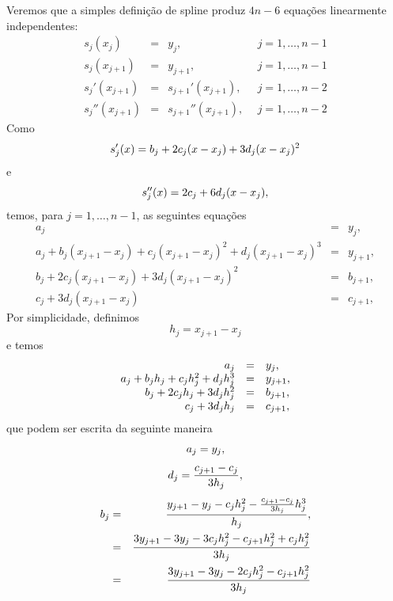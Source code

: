 Veremos que a simples definição de spline produz $4n-6$ equações linearmente independentes:
\begin{equation*}
\begin{array}{rcll}
s_j(x_j)&=&y_j,~~ &j=1,\ldots, n-1\\
s_{j}(x_{j+1})&=&y_{j+1},~~ &j=1,\ldots, n-1\\
s_{j}'(x_{j+1})&=&s_{j+1}'(x_{j+1}),~~ &j=1,\ldots, n-2\\
s_{j}''(x_{j+1})&=&s_{j+1}''(x_{j+1}),~~ &j=1,\ldots, n-2
\end{array}
\end{equation*}
Como
\begin{equation}{\label{eq_1derivada}}
s'_j(x)=b_j+2c_j(x-x_j)+3d_j(x-x_j)^2
\end{equation}
e
\begin{equation}{\label{eq_2derivada}}
s''_j(x)=2c_j+6d_j(x-x_j),
\end{equation}
temos, para $j=1,\ldots, n-1$, as seguintes equações
\begin{equation*}
\begin{array}{rcl}
a_j&=&y_j,\\
a_j+b_j(x_{j+1}-x_j)+c_j(x_{j+1}-x_j)^2+d_j(x_{j+1}-x_j)^3&=&y_{j+1},\\
b_j+2c_j(x_{j+1}-x_j)+3d_j(x_{j+1}-x_j)^2&=&b_{j+1},\\
c_j+3d_j(x_{j+1}-x_j)&=&c_{j+1},
\end{array}
\end{equation*}
Por simplicidade, definimos
$$
h_j=x_{j+1}-x_j
$$
e temos
\begin{equation}
\begin{array}{rcl}
a_j&=&y_j,\\
a_j+b_jh_j+c_jh_j^2+d_jh_j^3&=&y_{j+1},\\
{\label{eq3}}b_j+2c_jh_j+3d_jh_j^2&=&b_{j+1},\\
\nonumber c_j+3d_jh_j&=&c_{j+1},
\end{array}
\end{equation}
que podem ser escrita da seguinte maneira
\begin{equation}{\label{eq_an_spline}}
a_j=y_j,
\end{equation}
\begin{equation}{\label{eq_dn_spline}}
d_j=\frac{c_{j+1}-c_j}{3h_j},
\end{equation}
\begin{eqnarray}
\nonumber b_j&=&\frac{y_{j+1}-y_j-c_jh_j^2-\frac{c_{j+1}-c_j}{3h_j}h_j^3}{h_j},\\
\nonumber &=&\frac{3y_{j+1}-3y_j-3c_jh_j^2-c_{j+1}h_j^2+c_jh_j^2}{3h_j}\\
{\label{eq_bn_spline}}&=&\frac{3y_{j+1}-3y_j-2c_jh_j^2-c_{j+1}h_j^2}{3h_j}
\end{eqnarray}
